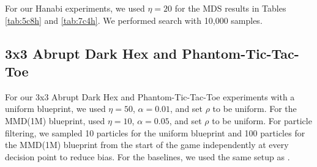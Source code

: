 \documentclass{article} %
\theoremstyle{plain}
\theoremstyle{definition}
\theoremstyle{remark}
\begin{document}
For our Hanabi experiments, we used $\eta=20$ for the MDS results in Tables \ref{tab:5c8h} and \ref{tab:7c4h}.
We performed search with 10,000 samples.

\subsection{3x3 Abrupt Dark Hex and Phantom-Tic-Tac-Toe}

For our 3x3 Abrupt Dark Hex and Phantom-Tic-Tac-Toe experiments with a uniform blueprint, we used $\eta=50$, $\alpha=0.01$, and set $\rho$ to be uniform.
For the MMD(1M) blueprint, used $\eta=10$, $\alpha=0.05$, and set $\rho$ to be uniform.
For particle filtering, we sampled 10 particles for the uniform blueprint and 100 particles for the MMD(1M) blueprint from the start of the game independently at every decision point to reduce bias.
For the baselines, we used the same setup as \citet{mmd}.
\end{document}
